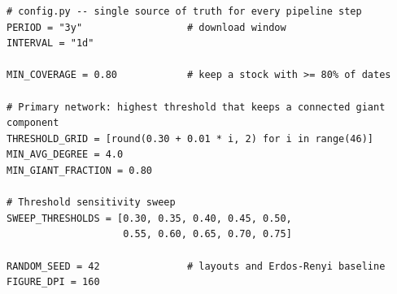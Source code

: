 \begin{lstlisting}[style=python]
# config.py -- single source of truth for every pipeline step
PERIOD = "3y"                  # download window
INTERVAL = "1d"

MIN_COVERAGE = 0.80            # keep a stock with >= 80% of dates

# Primary network: highest threshold that keeps a connected giant component
THRESHOLD_GRID = [round(0.30 + 0.01 * i, 2) for i in range(46)]
MIN_AVG_DEGREE = 4.0
MIN_GIANT_FRACTION = 0.80

# Threshold sensitivity sweep
SWEEP_THRESHOLDS = [0.30, 0.35, 0.40, 0.45, 0.50,
                    0.55, 0.60, 0.65, 0.70, 0.75]

RANDOM_SEED = 42               # layouts and Erdos-Renyi baseline
FIGURE_DPI = 160
\end{lstlisting}
